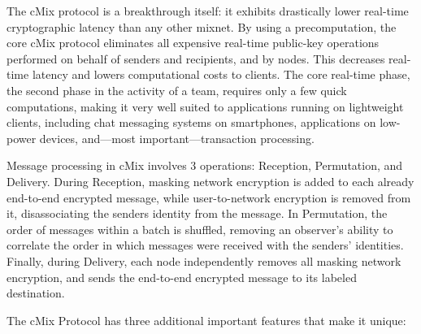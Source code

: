 The cMix protocol is a breakthrough itself: it exhibits drastically lower real-time cryptographic latency than any other mixnet. By using a precomputation, the core cMix protocol eliminates all expensive real-time public-key operations performed on behalf of senders and recipients, and by nodes. This decreases real-time latency and lowers computational costs to clients. The core real-time phase, the second phase in the activity of a team, requires only a few quick computations, making it very well suited to applications running on lightweight clients, including chat messaging systems on smartphones, applications on low-power devices, and---most important---transaction processing.

Message processing in cMix involves 3 operations: Reception, Permutation, and Delivery. During Reception, masking network encryption is added to each already end-to-end encrypted message, while user-to-network encryption is removed from it, disassociating the senders identity from the message. In Permutation, the order of messages within a batch is shuffled, removing an observer's ability to correlate the order in which messages were received with the senders' identities. Finally, during Delivery, each node independently removes all masking network encryption, and sends the end-to-end encrypted message to its labeled destination.

The cMix Protocol has three additional important features that make it unique:


